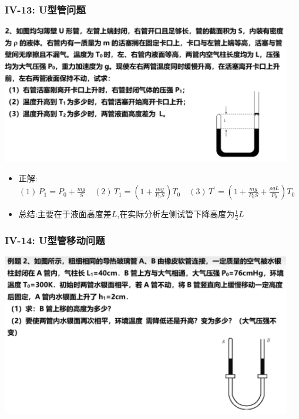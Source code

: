 \documentclass{article}
\begin{document}
\vspace{2em}

\subsubsection{IV-13: U型管问题}
\includegraphics[width = 0.95\textwidth,keepaspectratio]{./pictures/2.3-25.png}

\begin{itemize}
    \item 正解:\quad $(1) \, P_{1} = P_{0} + \frac{mg}{S} \quad (2) \, T_{1} = (1 + \frac{mg}{P_{0}S}) T_{0} \quad (3) \, T^{'} 
    = (1 + \frac{mg}{P_{0}S} + \frac{\rho g L}{P_{0}}) T_{0}$
    \item 总结:\quad 主要在于液面高度差$L$,在实际分析左侧试管下降高度为$\frac{1}{2}L$
\end{itemize}

\vspace{2em}

\subsubsection{IV-14: U型管移动问题}
\includegraphics[width = 0.95\textwidth,keepaspectratio]{./pictures/2.3-26.png}
\end{document}
